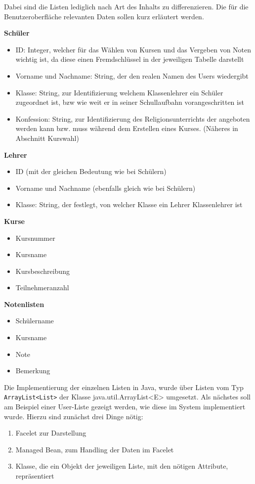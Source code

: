 Dabei sind die Listen lediglich nach Art des Inhalts zu differenzieren. 
Die für die Benutzeroberfläche relevanten Daten sollen kurz erläutert werden. 

\textbf{Schüler}
\begin{itemize}
  \item ID: Integer, welcher für das Wählen von Kursen und das Vergeben von Noten wichtig ist, da diese einen Fremdschlüssel in der jeweiligen Tabelle darstellt
  \item Vorname und Nachname: String, der den realen Namen des Users wiedergibt
  \item Klasse: String, zur Identifizierung welchem Klassenlehrer ein Schüler zugeordnet ist, bzw wie weit er in seiner Schullaufbahn vorangeschritten ist
  \item Konfession: String, zur Identifizierung des Religionsunterrichts der angeboten werden kann bzw. muss während dem Erstellen eines Kurses. (Näheres in Abschnitt Kurswahl)
\end{itemize}

\textbf{Lehrer}
\begin{itemize}
  \item ID (mit der gleichen Bedeutung wie bei Schülern)
  \item Vorname und Nachname (ebenfalls gleich wie bei Schülern)
  \item Klasse: String, der festlegt, von welcher Klasse ein Lehrer Klassenlehrer ist
\end{itemize}

\textbf{Kurse}
\begin{itemize}
  \item Kursnummer
  \item Kursname
  \item Kursbeschreibung
  \item Teilnehmeranzahl
\end{itemize}

\textbf{Notenlisten}
\begin{itemize}
  \item Schülername
  \item Kursname
  \item Note
  \item Bemerkung
\end{itemize}

Die Implementierung der einzelnen Listen in Java, wurde über Listen vom Typ \texttt{ArrayList<List>} der Klasse {java.util.ArrayList<E>} umgesetzt. 
Als nächstes soll am Beispiel einer User-Liste gezeigt werden, wie diese im System implementiert wurde.
Hierzu sind zunächst drei Dinge nötig:
\begin{enumerate}
  \item Facelet zur Darstellung
  \item Managed Bean, zum Handling der Daten im Facelet
  \item Klasse, die ein Objekt der jeweiligen Liste, mit den nötigen Attribute, repräsentiert
\end{enumerate}

